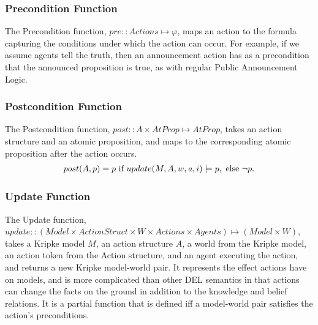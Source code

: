 \subsubsection{Precondition Function}
The Precondition function, $pre :: Actions \mapsto \varphi$, maps an action to the formula capturing the conditions under which the action can occur. For example, if we assume agents tell the truth, then an announcement action has as a precondition that the announced proposition is true, as with regular Public Announcement Logic. 



\subsubsection{Postcondition Function}
The Postcondition function, $post :: A \times AtProp \mapsto AtProp$, takes an action structure and an atomic proposition, and maps to the corresponding atomic proposition after the action occurs.
\begin{align*}
post(A,p)= p\ \mbox{if}\ update(M,A,w,\laa,i)\models p,\  \mbox{else}\ \tlnot p.
\end{align*} 

\subsubsection{Update Function}
The Update function, $update :: (Model \times ActionStruct \times W \times Actions \times Agents) \mapsto (Model \times W)$, takes a Kripke model $M$, an action structure $A$, a world from the Kripke model, an action token from the Action structure, and an agent executing the action, and returns a new Kripke model-world pair. It represents the effect actions have on models, and is more complicated than other DEL semantics in that actions can change the facts on the ground in addition to the knowledge and belief relations. It is a partial function that is defined iff a model-world pair satisfies the action's preconditions.
\\

